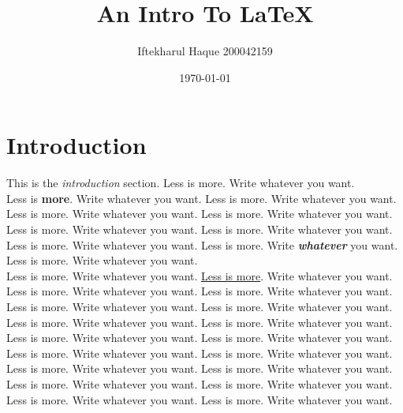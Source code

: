 \documentclass{article}
\title{An Intro To \LaTeX}
\author{Iftekharul Haque 200042159}
\date{\today}
\begin{document}
    \begin{titlepage}
        \maketitle
    \end{titlepage} 

    \begin{abstract}
        \kant[2-3]
    \end{abstract}
    
    \section{Introduction}
    This is the \emph{introduction} section. Less is more. Write whatever you want. \\
    
    Less is \textbf{more}. Write whatever you want. Less is more. Write whatever you want. Less is more. Write whatever you want. Less is more. Write whatever you want. Less is more. Write whatever you want. Less is more. Write whatever you want. Less is more. Write whatever you want. Less is more. Write \textit{\textbf{whatever}} you want. Less is more. Write whatever you want. \\

    Less is more. Write whatever you want. \underline{Less is more}. Write whatever you want. Less is more. Write whatever you want. Less is more. Write whatever you want. Less is more. Write whatever you want. Less is more. Write whatever you want. Less is more. Write whatever you want. Less is more. Write whatever you want. Less is more. Write whatever you want. \newline
    Less is more. Write whatever you want. Less is more. Write whatever you want. Less is more. Write whatever you want. Less is more. Write whatever you want. Less is more. Write whatever you want. Less is more. Write whatever you want. Less is more. Write whatever you want. Less is more. Write whatever you want. Less is more. Write whatever you want.

    
\end{document}
